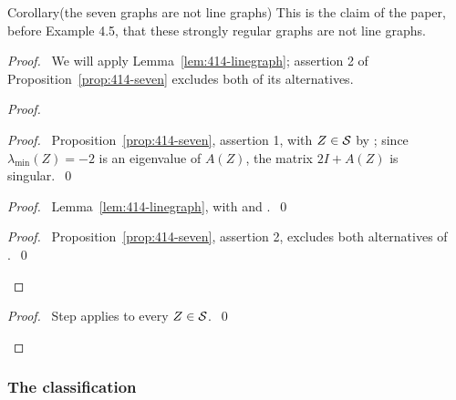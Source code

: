 \begin{namedresult}{Corollary}{(the seven graphs are not line graphs)}\label{cor:414-notline}
 This is the claim of the paper, before Example 4.5, that these strongly regular graphs are not
 line graphs.
\end{namedresult}
\begin{proof}
 \pfsketch\ We will apply Lemma~\ref{lem:414-linegraph}; assertion 2 of
 Proposition~\ref{prop:414-seven} excludes both of its alternatives.
 \begin{proof}
  \begin{proof}\pf\ Proposition~\ref{prop:414-seven}, assertion 1, with $Z\in{\mathcal S}$ by ;
   since $\lambda_{\min}(Z)=-2$ is an eigenvalue of $A(Z)$, the matrix $2I+A(Z)$ is
   singular.~\qed\end{proof}
  \begin{proof}\pf\ Lemma~\ref{lem:414-linegraph}, with  and
   .~\qed\end{proof}
  \qedstep
  \begin{proof}\pf\ Proposition~\ref{prop:414-seven}, assertion 2, excludes both alternatives
   of .~\qed\end{proof}
 \end{proof}
 \qedstep
 \begin{proof}\pf\ Step  applies to every $Z\in{\mathcal S}$.~\qed\end{proof}
\end{proof}

\subsubsection*{The classification}

